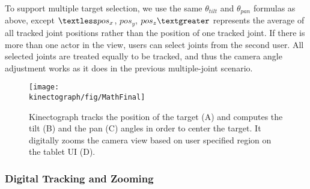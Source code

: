 
To support multiple target selection, we use the same $\theta_{tilt}$ and $\theta_{pan}$ formulas as above, except $\textless pos_{x}$, $pos_{y}$, $pos_{z} \textgreater$ represents the average of all tracked joint positions rather than the position of one tracked joint.
%
If there is more than one actor in the view, users can select joints from the second user. All selected joints are treated equally to be tracked, and thus the camera angle adjustment works as it does in the previous multiple-joint scenario.


\begin{figure}[t]
\centering
\texttt{[image: \\kinectograph/fig/MathFinal]}
\caption{Kinectograph tracks the position of the target (A) and computes the tilt (B) and the pan (C) angles in order to center the target. It digitally zooms the camera view based on user specified region on the tablet UI (D).}
\label{fig:math}
\end{figure}

\subsubsection{Digital Tracking and Zooming}


